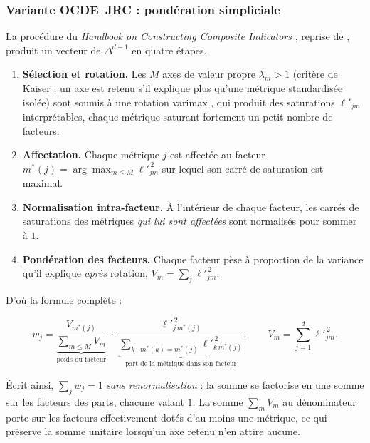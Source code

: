 \documentclass[11pt,a4paper]{article}
\theoremstyle{definition}
\theoremstyle{remark}
\newcommand{\simplex}{\Delta^{d-1}}
\begin{document}
\bigskip

\subsubsection{Variante OCDE--JRC : pondération simpliciale}
\label{sec:acp-oecd}

\medskip

La procédure du \emph{Handbook on Constructing Composite Indicators}
\citep[p.~89--90]{nardo2008}, reprise de \citet{nicoletti2000}, produit un vecteur de
$\simplex$ en quatre étapes.

\medskip

\begin{enumerate}[nosep,leftmargin=1.8em]
  \item \textbf{Sélection et rotation.} Les $M$ axes de valeur propre $\lambda_m > 1$
  (critère de Kaiser : un axe est retenu s'il explique plus qu'une métrique standardisée
  isolée) sont soumis à une rotation varimax \citep{kaiser1958}, qui produit des
  saturations $\ell'_{jm}$ interprétables, chaque métrique saturant fortement un petit
  nombre de facteurs.
  \item \textbf{Affectation.} Chaque métrique $j$ est affectée au facteur
  $m^*(j) = \arg\max_{m \le M} \ell'^{\,2}_{jm}$ sur lequel son carré de saturation est
  maximal.
  \item \textbf{Normalisation intra-facteur.} À l'intérieur de chaque facteur, les carrés
  de saturations des métriques \emph{qui lui sont affectées} sont normalisés pour sommer
  à $1$.
  \item \textbf{Pondération des facteurs.} Chaque facteur pèse à proportion de la variance
  qu'il explique \emph{après} rotation, $V_m = \sum_j \ell'^{\,2}_{jm}$.
\end{enumerate}

\bigskip

D'où la formule complète :

\medskip

\[
  w_j
  = \underbrace{\frac{V_{m^*(j)}}{\sum_{m \le M} V_m}}_{\text{poids du facteur}}
  \;\cdot\;
  \underbrace{\frac{\ell'^{\,2}_{j\,m^*(j)}}
                   {\sum_{k \,:\, m^*(k) = m^*(j)} \ell'^{\,2}_{k\,m^*(j)}}}
             _{\text{part de la métrique dans son facteur}},
  \qquad
  V_m = \sum_{j=1}^{d} \ell'^{\,2}_{jm}.
\]

\bigskip

Écrit ainsi, $\sum_j w_j = 1$ \emph{sans renormalisation} : la somme se factorise en une
somme sur les facteurs des parts, chacune valant $1$. La somme $\sum_m V_m$ au
dénominateur porte sur les facteurs effectivement dotés d'au moins une métrique, ce qui
préserve la somme unitaire lorsqu'un axe retenu n'en attire aucune.
\end{document}
